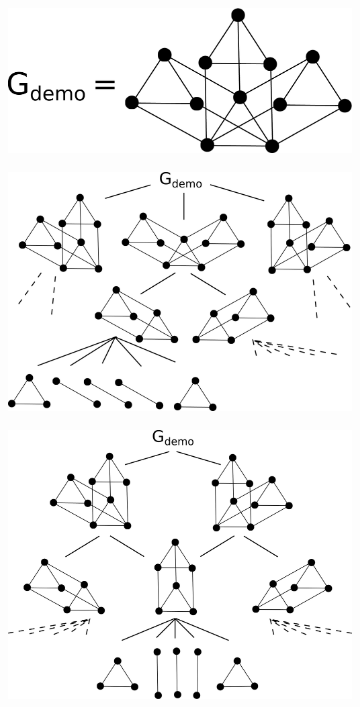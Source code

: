 \ClearMyMinHeight
{}

\begin{figure}\centering%
  \begin{subfigure}{0.4\linewidth}\centering
    \includegraphics[height=\myMinHeight]{../../img/svg/3xc2c3}
    \caption{}\label{fig:demo_graph:graph}
  \end{subfigure}%
  \hfill
  \begin{subfigure}{0.3\linewidth}\centering
    \includegraphics[height=\myMinHeight]{../../img/svg/3xc2c3_comdrp}
    \caption{}\label{fig:demo_graph:comdrp}
  \end{subfigure}%
  \hfill
  \begin{subfigure}{0.3\linewidth}\centering
    \includegraphics[height=\myMinHeight]{../../img/svg/3xc2c3_candrp}

\end{subfigure}
\end{figure}
